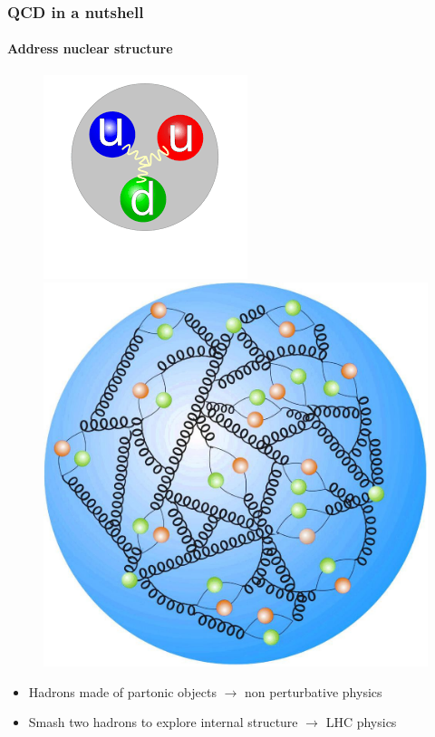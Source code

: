 \documentclass[aspectratio=43]{beamer}
\begin{document}
\begin{frame}

	\frametitle{QCD in a nutshell}
	\framesubtitle{Address nuclear structure}
	
	\begin{figure}
		\includegraphics[width = 0.5\linewidth]{plots/proton.png}
		\endminipage\hfill
		\includegraphics[width = 0.4\linewidth]{plots/proton2.jpg}
		\endminipage
	\end{figure}
	
	\begin{itemize}
		\item Hadrons made of partonic objects $\longrightarrow$ non perturbative physics
		\item Smash two hadrons to explore internal structure $\longrightarrow$ LHC physics
	\end{itemize}

\end{frame}
\end{document}
